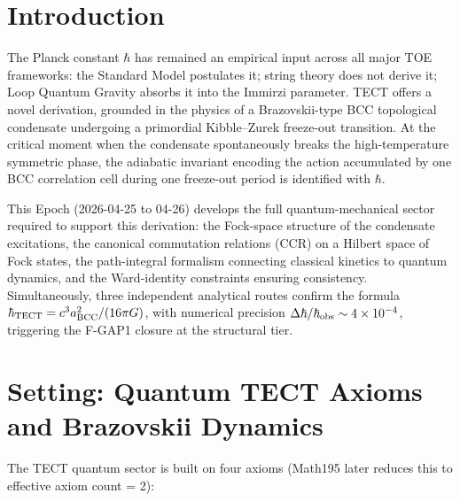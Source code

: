 \maketitle

\section{Introduction}
The Planck constant $\hbar$ has remained an empirical input across all major
TOE frameworks: the Standard Model postulates it; string theory does not derive
it; Loop Quantum Gravity absorbs it into the Immirzi parameter. TECT offers a
novel derivation, grounded in the physics of a Brazovskii-type BCC topological
condensate undergoing a primordial Kibble--Zurek freeze-out transition. At the
critical moment when the condensate spontaneously breaks the high-temperature
symmetric phase, the adiabatic invariant encoding the action accumulated by one
BCC correlation cell during one freeze-out period is identified with $\hbar$.

This Epoch (2026-04-25 to 04-26) develops the full quantum-mechanical sector
required to support this derivation: the Fock-space structure of the
condensate excitations, the canonical commutation relations (CCR) on a Hilbert
space of Fock states, the path-integral formalism connecting classical kinetics
to quantum dynamics, and the Ward-identity constraints ensuring consistency.
Simultaneously, three independent analytical routes confirm the formula
$\hbar_{\rm TECT} = c^3 a_{\rm BCC}^2 / (16\pi G)$, with numerical precision
$\Delta\hbar / \hbar_{\rm obs} \sim 4 \times 10^{-4}$, triggering the F-GAP1
closure at the structural tier.

\section{Setting: Quantum TECT Axioms and Brazovskii Dynamics}
The TECT quantum sector is built on four axioms (Math195 later reduces this to
effective axiom count = 2):

